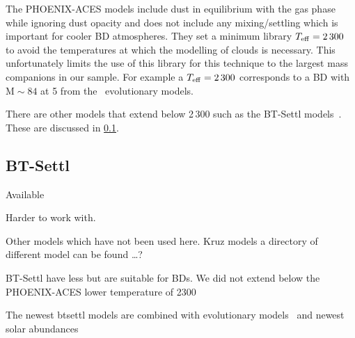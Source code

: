 The {PHOENIX-ACES} models include dust in equilibrium with the gas phase while ignoring dust opacity and does not include any mixing/settling which is important for cooler {BD} atmospheres.
They set a minimum library \(T_{\mathrm{eff}}{}=2\,300\)\K{} to avoid the temperatures at which the modelling of clouds is necessary.
This unfortunately limits the use of this library for this technique to the largest mass companions in our sample.
For example a \(T_{\mathrm{eff}}{}=2\,300\)\K{} corresponds to a {BD} with \(\textrm{M}\sim84\)\Mjup{} at 5\Gyr{} from the~\citet{baraffe_evolutionary_2003} evolutionary models.

There are other models that extend below 2\,300\K{} such as the {BT-Settl} models~\citep{allard_btsettl_2013, baraffe_new_2015}.
These are discussed in \cref{subsec:btsettl}.




\subsection{BT-Settl}
\label{subsec:btsettl}
Available 

Harder to work with.

Other models which have not been used here.
Kruz models a directory of different model can be found \ldots{}?

BT-Settl have less but are suitable for BDs.
We did not extend below the {PHOENIX-ACES} lower temperature of 2300\K{}


The newest btsettl models are combined with evolutionary models~\citep{barrafe_new_2015} and newest   solar abundances


